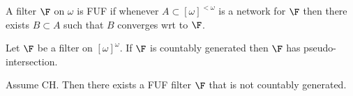 \documentclass{article}
\begin{document}
\begin{defn}
    A filter \(\F\) on \(\omega\) is FUF if whenever \(A \subset [\omega]^{<\omega}\) is a network for \(\F\) then there exists \(B \subset A\) such that \(B\) converges wrt to \(\F\).
\end{defn}
\begin{lem}
    Let \(\F\) be a filter on \([\omega]^{\omega}\). If \(\F\) is countably generated then \(\F\) has pseudo-intersection.
\end{lem}

\begin{prop}
    Assume CH. Then there exists a FUF filter \(\F\) that is not countably generated.
\end{prop}
\end{document}
